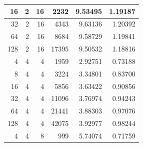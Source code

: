 \documentclass[journal,transmag]{IEEEtran}
\begin{document}
\begin{table}[h]
\begin{tabular}{|r|r|r|r|r|r|}
		16                            & 2                          & 16                               & 2232                           & 9.53495                       & 1.19187                         \\ \hline
		32                            & 2                          & 16                               & 4343                           & 9.63136                       & 1.20392                         \\ \hline
		64                            & 2                          & 16                               & 8684                           & 9.58729                       & 1.19841                         \\ \hline
		128                           & 2                          & 16                               & 17395                          & 9.50532                       & 1.18816                         \\ \hline
		4                             & 4                          & 4                                & 1959                           & 2.92751                       & 0.73188                         \\ \hline
		8                             & 4                          & 4                                & 3224                           & 3.34801                       & 0.83700                         \\ \hline
		16                            & 4                          & 4                                & 5856                           & 3.63422                       & 0.90856                         \\ \hline
		32                            & 4                          & 4                                & 11096                          & 3.76974                       & 0.94243                         \\ \hline
		64                            & 4                          & 4                                & 21441                          & 3.88303                       & 0.97076                         \\ \hline
		128                           & 4                          & 4                                & 42075                          & 3.92977                       & 0.98244                         \\ \hline
		4                             & 4                          & 8                                & 999                            & 5.74074                       & 0.71759                         \\ \hline

\end{tabular}
\end{table}
\end{document}
